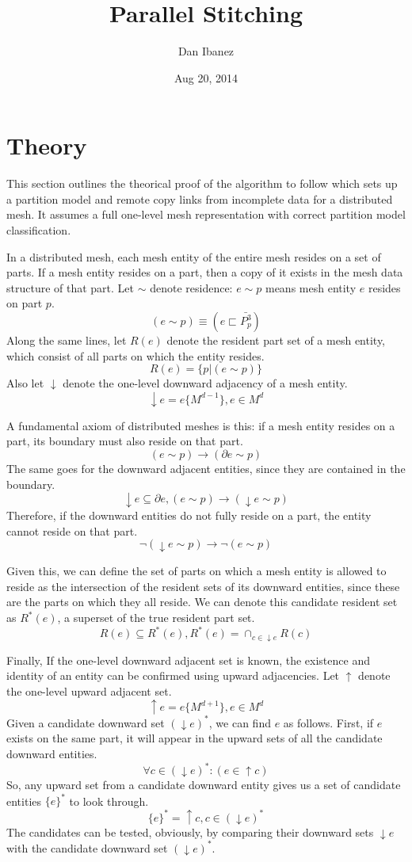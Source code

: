 \documentclass{article}
\title{Parallel Stitching}
\author{Dan Ibanez}
\date{Aug 20, 2014}
\begin{document}
\maketitle

\section{Theory}

This section outlines the theorical proof of the algorithm
to follow which sets up a partition model and remote
copy links from incomplete data for a distributed mesh.
It assumes a full one-level mesh representation with
correct partition model classification.

In a distributed mesh, each mesh entity of the entire mesh
resides on a set of parts.
If a mesh entity resides on a part, then a copy of it exists
in the mesh data structure of that part.
Let $\sim$ denote residence: $e\sim p$ means mesh entity $e$ resides
on part $p$.
\[(e \sim p)\equiv(e \sqsubset \bar{P^3_p})\]
Along the same lines, let $R(e)$ denote the resident part set of
a mesh entity, which consist of all parts on which the entity resides.
\[R(e) = \{p|(e\sim p)\}\]
Also let $\downarrow$ denote the one-level downward adjacency of
a mesh entity.
\[\downarrow e = e\{M^{d-1}\}, e \in M^d\]

A fundamental axiom of distributed meshes is this: if a
mesh entity resides on a part, its boundary must also reside
on that part.
\[(e\sim p) \to (\partial e\sim p)\]
The same goes for the downward adjacent entities, since they are contained
in the boundary.
\[\downarrow e \subseteq \partial e,
(e\sim p)\to(\downarrow e\sim p)\]
Therefore, if the downward entities do
not fully reside on a part, the entity cannot reside on that part.
\[\neg (\downarrow e\sim p) \to \neg (e\sim p)\]

Given this, we can define the set of parts on which a mesh entity
is allowed to reside as the intersection of the resident sets of
its downward entities, since these are the parts on which
they all reside.
We can denote this candidate resident set as $R^*(e)$, a superset
of the true resident part set.
\[R(e) \subseteq R^*(e), R^*(e) = \cap_{c\in \downarrow e} R(c)\]

Finally, If the one-level downward adjacent set is known,
the existence and identity of an entity can be confirmed
using upward adjacencies.
Let $\uparrow$ denote the one-level upward adjacent set.
\[\uparrow e = e\{M^{d+1}\}, e \in M^d\]
Given a candidate downward set $(\downarrow e)^*$, we can
find $e$ as follows.
First, if $e$ exists on the same part, it will appear in
the upward sets of all the candidate downward entities.
\[\forall c\in (\downarrow e)^* : (e \in \uparrow c)\]
So, any upward set from a candidate downward entity
gives us a set of candidate entities $\{e\}^*$
to look through.
\[\{e\}^* = \uparrow c, c \in (\downarrow e)^*\]
The candidates can be tested, obviously, by comparing
their downward sets $\downarrow e$ with the candidate
downward set $(\downarrow e)^*$.
\end{document}
